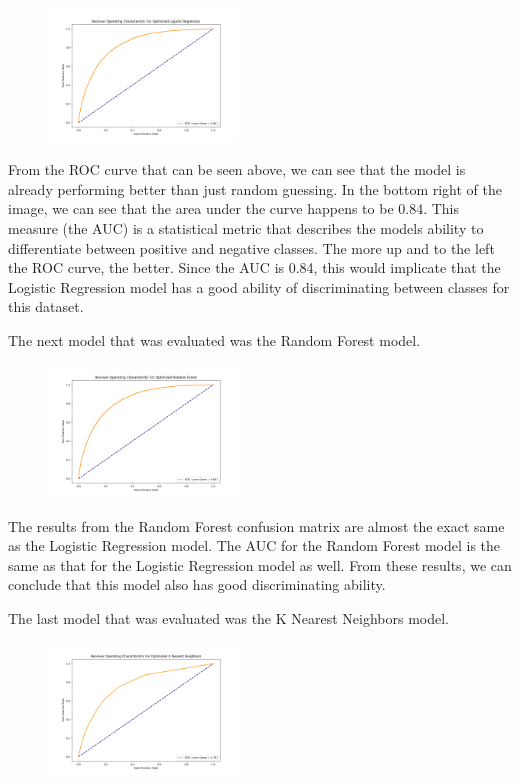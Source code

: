 \newpage

\begin{figure}[h]
    \centering
    \includegraphics[width=0.45\textwidth]{"Images/LR ROC.png"}
\end{figure}

From the ROC curve that can be seen above, we can see that the model is already performing better than just random guessing. In the bottom right of the image, we can see that the area under the curve happens to be 0.84. This measure (the AUC)
is a statistical metric that describes the models ability to differentiate between positive and negative classes. The more up and to the left the ROC curve, the better. Since the AUC is 0.84, this would implicate that the Logistic
Regression model has a good ability of discriminating between classes for this dataset.

The next model that was evaluated was the Random Forest model.

\begin{figure}[h]
    \centering
    \includegraphics[width=0.45\textwidth]{"Images/RF ROC.png"}
\end{figure}

The results from the Random Forest confusion matrix are almost the exact same as the Logistic Regression model. The AUC for the Random Forest model is the same as that for the Logistic Regression model as well. From these results, we can
conclude that this model also has good discriminating ability.

The last model that was evaluated was the K Nearest Neighbors model.

\begin{figure}[h]
    \centering
    \includegraphics[width=0.45\textwidth]{"Images/KNN ROC.png"}
\end{figure}

